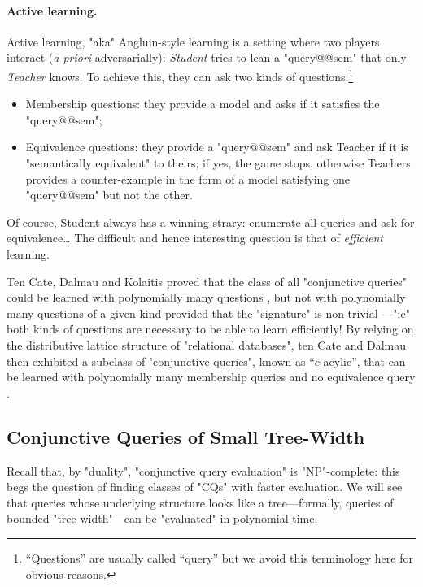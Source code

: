 \paragraph*{Active learning.}
Active learning, "aka" Angluin-style learning is a setting where
two players interact (\emph{a priori} adversarially): \emph{Student} tries
to lean a "query@@sem" that only \emph{Teacher} knows. To achieve this,
they can ask two kinds of questions.\footnote{``Questions'' are usually called 
``query'' but we avoid this terminology here for obvious reasons.}
\begin{itemize}
	\item Membership questions: they provide a model and asks if it satisfies the "query@@sem";
	\item Equivalence questions: they provide a "query@@sem" and ask Teacher if
		it is "semantically equivalent" to theirs; if yes, the game stops, otherwise
		Teachers provides a counter-example in the form of a model satisfying
		one "query@@sem" but not the other.
\end{itemize}
Of course, Student always has a winning strary: enumerate all queries
and ask for equivalence… The difficult and hence interesting question
is that of \emph{efficient} learning.

Ten Cate, Dalmau and Kolaitis proved that 
the class of all "conjunctive queries" could be
learned with polynomially many questions \cite[Theorem~A]{tenCateDalmauKolaitis2013Learning},
but not with polynomially many questions of a given kind provided
that the "signature" is non-trivial \cite[Theorem~B]{tenCateDalmauKolaitis2013Learning}---"ie"
both kinds of questions are necessary to be able to learn efficiently!
By relying on the distributive lattice structure of "relational databases",
ten Cate and Dalmau then exhibited a subclass of "conjunctive queries",
known as ``$c$-acylic'', that can be learned with
polynomially many membership queries
and no equivalence query \cite[Theorem~5.2]{tenCateDalmau2021ActiveLearning}.


\subsection{Conjunctive Queries of Small Tree-Width}
\AP\label{sec:prelim-db-tw}

Recall that, by "duality", "conjunctive query evaluation" is "NP"-complete:
this begs the question of finding classes of "CQs" with faster evaluation.
We will see that queries whose underlying structure looks like
a tree---formally, queries of bounded "tree-width"---can be "evaluated" in polynomial time.


